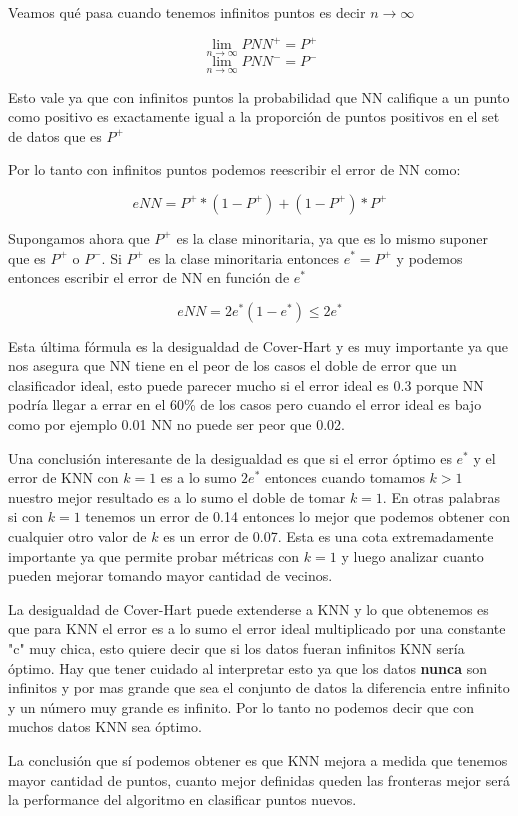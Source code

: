 Veamos qué pasa cuando tenemos infinitos puntos es decir $n\to\infty$

$$\lim_{n\to\infty} PNN^+ = P^+$$
$$\lim_{n\to\infty} PNN^- = P^-$$

Esto vale ya que con infinitos puntos la probabilidad que NN califique a un punto como positivo es exactamente igual a la proporción de puntos positivos en el set de datos que es $P^+$

Por lo tanto con infinitos puntos podemos reescribir el error de NN como:

$$eNN = P^+*(1-P^+) + (1-P^+)*P^+$$

Supongamos ahora que $P^+$ es la clase minoritaria, ya que es lo mismo suponer que es $P^+$ o $P^-$. Si $P^+$ es la clase minoritaria entonces $e^*=P^+$ y podemos entonces escribir el error de NN en función de $e^*$

$$eNN = 2 e^*(1-e^*) \leq 2e^*$$

Esta última fórmula es la desigualdad de Cover-Hart y es muy importante ya que nos asegura que NN tiene en el peor de los casos el doble de error que un clasificador ideal, esto puede parecer mucho si el error ideal es 0.3 porque NN podría llegar a errar en el 60\% de los casos pero cuando el error ideal es bajo como por ejemplo 0.01 NN no puede ser peor que 0.02.

Una conclusión interesante de la desigualdad es que si el error óptimo es $e^*$ y el error de KNN con $k=1$ es a lo sumo $2e^*$ entonces cuando tomamos $k>1$ nuestro mejor resultado es a lo sumo el doble de tomar $k=1$. En otras palabras si con $k=1$ tenemos un error de 0.14 entonces lo mejor que podemos obtener con cualquier otro valor de $k$ es un error de 0.07. Esta es una cota extremadamente importante ya que permite probar métricas con $k=1$ y luego analizar cuanto pueden mejorar tomando mayor cantidad de vecinos.

La desigualdad de Cover-Hart puede extenderse a KNN y lo que obtenemos es que para KNN el error es a lo sumo el error ideal multiplicado por una constante "c" muy chica, esto quiere decir que si los datos fueran infinitos KNN sería óptimo. Hay que tener cuidado al interpretar esto ya que los datos \textbf{nunca} son infinitos y por mas grande que sea el conjunto de datos la diferencia entre infinito y un número muy grande es infinito. Por lo tanto no podemos decir que con muchos datos KNN sea óptimo. 

La conclusión que sí podemos obtener es que KNN mejora a medida que tenemos mayor cantidad de puntos, cuanto mejor definidas queden las fronteras mejor será la performance del algoritmo en clasificar puntos nuevos. 


